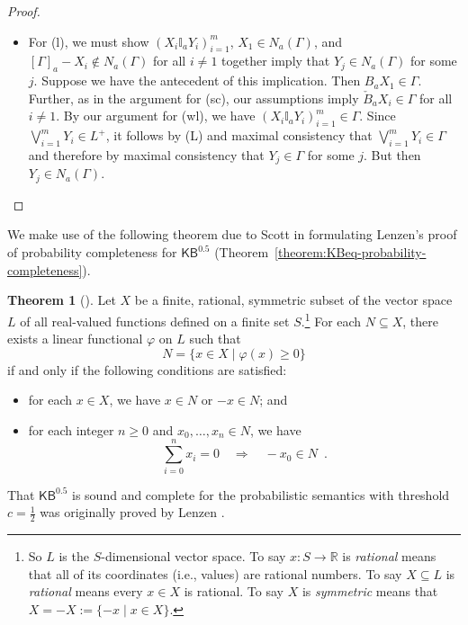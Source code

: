 \documentclass[12pt]{article}
\newcommand{\XXXcomment}[1]{}
\newcommand{\XXXcomment}[1]{\marginpar{\color{blue}{\footnotesize #1}}}
\theoremstyle{definition}
\newtheorem{theorem}{Theorem}[section]
\newcommand{\KBeq}{{\mathsf{KB}^{\mathsf{0.5}}}}       %
\begin{document}
\begin{proof}
\begin{itemize}
  \item For (l), we must show $(X_i\mathbb{I}_aY_i)_{i=1}^m$,
    $X_1\in N_a(\Gamma)$, and $[\Gamma]_a-X_i\notin N_a(\Gamma)$
    for all $i\neq 1$ together imply that $Y_j\in N_a(\Gamma)$
    for some $j$.  Suppose we have the antecedent of this implication.
    Then $B_aX_1\in\Gamma$.  Further, as in the argument for (sc), our
    assumptions imply $\check B_aX_i\in\Gamma$ for all $i\neq 1$.
    By our argument for (wl), we have $(X_i\mathbb{I}_aY_i)_{i=1}^m\in\Gamma$.
    Since $\bigvee_{i=1}^mY_i\in L^+$, it follows by (L) and maximal consistency
    that $\bigvee_{i=1}^mY_i\in\Gamma$ and therefore by maximal consistency
    that $Y_j\in\Gamma$ for some $j$.  But then $Y_j\in N_a(\Gamma)$.
    \qedhere
  \end{itemize}
\end{proof}

We make use of the following theorem due to Scott \cite{Sco64:JMP} in
formulating Lenzen's proof of probability completeness for $\KBeq$
(Theorem~\ref{theorem:KBeq-probability-completeness}).

\begin{theorem}[{\cite[Theorem 1.2]{Sco64:JMP}}]
  Let $X$ be a finite, rational, symmetric subset of
  the vector space $L$ of all real-valued functions defined on a finite set 
  $S$.\footnote{So $L$ is the $S$-dimensional vector space.
  To say $x:S\to\mathbb{R}$ is \emph{rational} means that all of its
  coordinates (i.e., values) are rational numbers.  
  To say $X\subseteq L$ is \emph{rational} means every $x\in X$ is rational.
  To say $X$ is \emph{symmetric} means that $X=-X:=\{-x\mid x\in X\}$.}
  For each $N\subseteq X$,
  there exists a linear functional $\varphi$ on $L$ such that
  \[
  N = \{x\in X\mid \varphi(x)\geq 0\}
  \]
  if and only if the following conditions are satisfied:
  \begin{itemize}
  \item for each $x\in X$, we have $x\in N$ or $-x\in N$; and

  \item for each integer $n\geq 0$ and $x_0,\dots,x_n\in N$, we have
  \[
  \sum_{i=0}^n x_i = 0
  \quad\Rightarrow\quad
  -x_0\in N\enspace.
  \]
  \end{itemize}
\end{theorem}

\XXXcomment{BR: added comment (and citation in theorem) crediting Lenzen.}

That $\KBeq$ is sound and complete for the probabilistic semantics
with threshold $c=\frac 12$ was originally proved by Lenzen
\cite{Lenzen1980:gwuw}.
\end{document}
